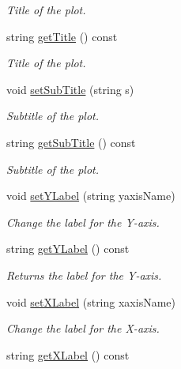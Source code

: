 \begin{DoxyCompactItemize}
\begin{DoxyCompactList}\small\item\em Title of the plot. \end{DoxyCompactList}\item 
string \mbox{\hyperlink{classbridges_1_1datastructure_1_1_line_chart_aa38d6cf9657d2757a98b657f079ae2bc}{get\+Title}} () const
\begin{DoxyCompactList}\small\item\em Title of the plot. \end{DoxyCompactList}\item 
void \mbox{\hyperlink{classbridges_1_1datastructure_1_1_line_chart_a578c2590cb6baa8ef40ba1251bd1279e}{set\+Sub\+Title}} (string s)
\begin{DoxyCompactList}\small\item\em Subtitle of the plot. \end{DoxyCompactList}\item 
string \mbox{\hyperlink{classbridges_1_1datastructure_1_1_line_chart_a07a4424d4bbc1cdd15cef3e2c0f0c075}{get\+Sub\+Title}} () const
\begin{DoxyCompactList}\small\item\em Subtitle of the plot. \end{DoxyCompactList}\item 
void \mbox{\hyperlink{classbridges_1_1datastructure_1_1_line_chart_ac41be5abf80052f1ace777072845a9d0}{set\+Y\+Label}} (string yaxis\+Name)
\begin{DoxyCompactList}\small\item\em Change the label for the Y-\/axis. \end{DoxyCompactList}\item 
string \mbox{\hyperlink{classbridges_1_1datastructure_1_1_line_chart_a682095169d9a7ce3899f129a13fd9616}{get\+Y\+Label}} () const
\begin{DoxyCompactList}\small\item\em Returns the label for the Y-\/axis. \end{DoxyCompactList}\item 
void \mbox{\hyperlink{classbridges_1_1datastructure_1_1_line_chart_ab31677353448c66017eb93bf61c087ce}{set\+X\+Label}} (string xaxis\+Name)
\begin{DoxyCompactList}\small\item\em Change the label for the X-\/axis. \end{DoxyCompactList}\item 
string \mbox{\hyperlink{classbridges_1_1datastructure_1_1_line_chart_aba75962040195f35f8801714e050ad91}{get\+X\+Label}} () const

\end{DoxyCompactItemize}
